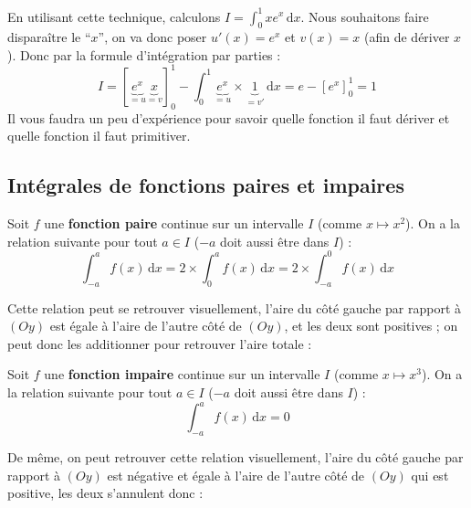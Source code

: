 	\begin{tip}[Exemple]
		En utilisant cette technique, calculons $I = \int_{0}^1 xe^x \, \mathrm{d}x$. Nous souhaitons faire disparaître le ``$x$'', on va donc poser $u'(x) = e^x$ et $v(x) = x$ (afin de dériver $x$).
		\newpar
		Donc par la formule d'intégration par parties :
		\[ I = \left[\underbrace{e^x}_{= u} \underbrace{x}_{= v}\right]_0^1 - \int_{0}^1 \underbrace{e^x}_{= u} \times \underbrace{1}_{= v'} \, \mathrm{d}x = e - \left[ e^x \right]_0^1 = 1 \]
		Il vous faudra un peu d'expérience pour savoir quelle fonction il faut dériver et quelle fonction il faut primitiver.
	\end{tip}

	\subsection{Intégrales de fonctions paires et impaires}
	\label{integrales-paires-impaires}

	\begin{formula}
		Soit $f$ une \textbf{fonction paire} continue sur un intervalle $I$ (comme $x \mapsto x^2$). On a la relation suivante pour tout $a \in I$ ($-a$ doit aussi être dans $I$) :
		\[ \int_{-a}^{a} f(x) \, \mathrm{d}x = 2 \times \int_{0}^{a} f(x) \, \mathrm{d}x = 2 \times \int_{-a}^{0} f(x) \, \mathrm{d}x \]
	\end{formula}

	\begin{tip}[Exemple]
		Cette relation peut se retrouver visuellement, l'aire du côté gauche par rapport à $(Oy)$ est égale à l'aire de l'autre côté de $(Oy)$, et les deux sont positives ; on peut donc les additionner pour retrouver l'aire totale :
	\end{tip}

	\begin{formula}
		Soit $f$ une \textbf{fonction impaire} continue sur un intervalle $I$ (comme $x \mapsto x^3$). On a la relation suivante pour tout $a \in I$ ($-a$ doit aussi être dans $I$) :
		\[ \int_{-a}^{a} f(x) \, \mathrm{d}x = 0 \]
	\end{formula}

	\begin{tip}[Exemple]
		De même, on peut retrouver cette relation visuellement, l'aire du côté gauche par rapport à $(Oy)$ est négative et égale à l'aire de l'autre côté de $(Oy)$ qui est positive, les deux s'annulent donc :
	\end{tip}

